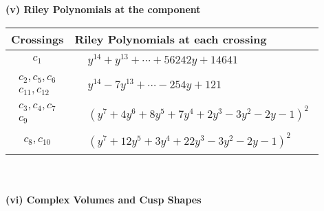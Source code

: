 \documentclass[1p]{elsarticle_modified}
\theoremstyle{definition}
\begin{document}
\newpage\renewcommand{\arraystretch}{1}
\flushleft \textbf{(v) Riley Polynomials at the component}\newline \\
\begin{tabular}{m{50pt}|m{274pt}}
Crossings & \hspace{64pt}Riley Polynomials at each crossing \\
\hline $$\begin{aligned}c_{1}\end{aligned}$$&$\begin{aligned}
&y^{14}+y^{13}+\cdots+56242 y+14641
\end{aligned}$\\
\hline $$\begin{aligned}c_{2},c_{5},c_{6}\\c_{11},c_{12}\end{aligned}$$&$\begin{aligned}
&y^{14}-7 y^{13}+\cdots-254 y+121
\end{aligned}$\\
\hline $$\begin{aligned}c_{3},c_{4},c_{7}\\c_{9}\end{aligned}$$&$\begin{aligned}
&(y^7+4 y^6+8 y^5+7 y^4+2 y^3-3 y^2-2 y-1)^2
\end{aligned}$\\
\hline $$\begin{aligned}c_{8},c_{10}\end{aligned}$$&$\begin{aligned}
&(y^7+12 y^5+3 y^4+22 y^3-3 y^2-2 y-1)^2
\end{aligned}$\\
\hline
\end{tabular}\\~\\
\newpage\flushleft \textbf{(vi) Complex Volumes and Cusp Shapes}
\end{document}
